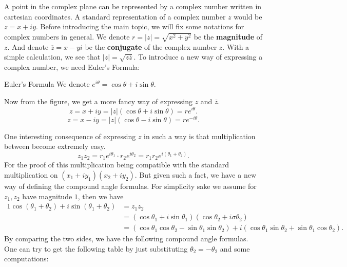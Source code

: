 
A point in the complex plane can be represented by a complex number written in cartesian coordinates. A standard representation of a complex number $z$ would be $z=x+iy$. 
Before introducing the main topic, we will fix some notations for complex numbers in general. We denote $r=|z|=\sqrt{x^2+y^2}$ be the \textbf{magnitude} of $z$. And denote $\overline{z}=x-yi$ be the \textbf{conjugate} of the complex number $z$. With a simple calculation, we see that $|z|=\sqrt{z\overline{z}}$.
To introduce a new way of expressing a complex number, we need Euler's Formula:
\\

{
\begin{definition}[def:]{Euler's Formula}
    We denote $e^{i\theta}=\cos \theta+i\sin \theta$.
\end{definition}
}

Now from the figure, we get a more fancy way of expressing $z$ and $\overline{z}$.
\[
    z=x+iy=|z|(\cos \theta+i\sin \theta)=re^{i\theta}.
\]
\[
    z=x-iy=|z|(\cos \theta-i\sin \theta)=re^{-i\theta}.
\]

One interesting consequence of expressing $z$ in such a way is that multiplication between become extremely easy. 
\[
    z_1z_2=r_1e^{i\theta_1}\cdot r_2e^{i\theta_2}=r_1r_2e^{i(\theta_1+\theta_2)}.
\]
For the proof of this multiplication being compatible with the standard multiplication on $(x_1+iy_1)(x_2+iy_2)$. But given such a fact, we have a new way of defining the compound angle formulas. For simplicity sake we assume for $z_1,z_2$ have magnitude $1$, then we have
\begin{alignat*}{1}
    \cos (\theta_1+\theta_2) + i\sin (\theta_1+\theta_2)
    &= z_1z_2\\
    &= (\cos \theta_1+i\sin \theta_1)(\cos \theta_2+i\sigma\theta_2)\\
    &= (\cos \theta_1\cos \theta_2 -\sin \theta_1\sin \theta_2) + i(\cos \theta_1\sin \theta_2+\sin \theta_1\cos \theta_2).
\end{alignat*}
By comparing the two sides, we have the following compound angle formulas. One can try to get the following table by just substituting $\theta_2=-\theta_2$ and some computations:

